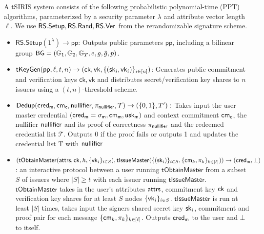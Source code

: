 A tSIRIS system consists of the following probabilistic polynomial-time (PPT) algorithms, parameterized by a security parameter $\lambda$ and attribute vector length $\ell$. We use $\mathsf{RS.Setup}, \mathsf{RS.Rand}, \mathsf{RS.Ver}$ from the rerandomizable signature scheme.

\begin{definition}[tSIRIS]
    \begin{itemize}
    \item $\mathsf{RS.Setup}(1^\lambda) \to \mathsf{pp}$: Outputs public parameters $\mathsf{pp}$, including a bilinear group $\mathsf{BG} = (\mathbb{G}_1, \mathbb{G}_2, \mathbb{G}_T, e, g, \tilde{g}, p)$.

    \item $\mathsf{tKeyGen}(\mathsf{pp}, \ell, t, n) \to (\mathsf{ck}, \mathsf{vk}, \{(\mathsf{sk}_i, \mathsf{vk}_i)\}_{i \in [n]})$: Generates public commitment and verification keys  $\mathsf{ck}, \mathsf{vk}$ and distributes secret/verification key shares to $n$ issuers using a $(t,n)$-threshold scheme.

    \item $\mathsf{Dedup}(\mathsf{cred_m}, \mathsf{cm_c}, \mathsf{nullifier}, \pi_{\mathsf{nullifier}}, \mathcal{T}) \to (\{0,1\}, T'):$ Takes input the user master credential $(\mathsf{cred_m} = \sigma_{\mathsf{m}}, \mathsf{cm_m}, \mathsf{usk_m})$ and context commitment $\mathsf{cm_c}$, the nullifier $\mathsf{nullifier}$ and its proof of correctness $\pi_{\mathsf{nullifier}}$ and the redeemed credential list $\mathcal{T}$. Outputs 0 if the proof fails or outputs 1 and updates the credential list T with $\mathsf{nullifier}$

    \item $(\mathsf{tObtainMaster}(\mathsf{attrs}, \mathsf{ck},h, \{\mathsf{vk}_i\}_{i \in S}), \mathsf{tIssueMaster}(\{(\mathsf{sk}_i)\}_{i \in S}, \{\mathsf{cm}_k, \pi_k\}_{k \in [\ell]})) \to (\mathsf{cred_m}, \bot)$: an interactive protocol between a user running $\mathsf{tObtainMaster}$ from a subset $S$ of issuers where $|S| \geq t$ with each issuer running $\mathsf{tIssueMaster}$. $\mathsf{tObtainMaster}$ takes in the user's attributes $\mathsf{attrs}$, commitment key $\mathsf{ck}$ and verification key shares for at least $S$ nodes $\{\mathsf{vk}_i\}_{i \in S}$. $\mathsf{tIssueMaster}$ is run at least $|S|$ times, takes input the signers shared secret key $\mathsf{sk}_i$, commitment and proof pair for each message  $\{\mathsf{cm}_k, \pi_k\}_{k \in [\ell]}$. Outputs $\mathsf{cred_m}$ to the user and $\bot$ to itself.


\end{itemize}
\end{definition}
